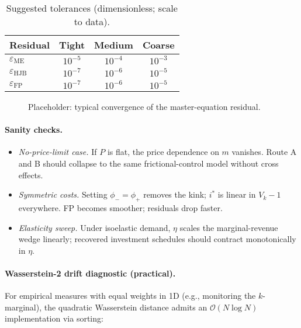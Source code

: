 ﻿\documentclass[11pt,letterpaper,oneside]{article}
\numberwithin{equation}{section}
\newcommand{\1}{\mathbf{1}}
\begin{document}
\begin{table}[ht]
\centering
\small
\begin{tabular}{@{}lccc@{}}
\toprule
Residual & Tight & Medium & Coarse \\
\midrule
$\varepsilon_{\mathrm{ME}}$ & $10^{-5}$ & $10^{-4}$ & $10^{-3}$ \\
$\varepsilon_{\mathrm{HJB}}$ & $10^{-7}$ & $10^{-6}$ & $10^{-5}$ \\
$\varepsilon_{\mathrm{FP}}$  & $10^{-7}$ & $10^{-6}$ & $10^{-5}$ \\
\bottomrule
\end{tabular}
\caption{Suggested tolerances (dimensionless; scale to data).}
\end{table}

\begin{figure}[ht]
\centering
{}
\caption{Placeholder: typical convergence of the master-equation residual.}
\end{figure}

\paragraph{Sanity checks.}
\begin{itemize}[leftmargin=1.25em]
\item \emph{No-price-limit case.} If $P$ is flat, the price dependence on $m$ vanishes. Route A and B should collapse to the same frictional-control model without cross effects.
\item \emph{Symmetric costs.} Setting $\phi_-=\phi_+$ removes the kink; $i^*$ is linear in $V_k-1$ everywhere. FP becomes smoother; residuals drop faster.
\item \emph{Elasticity sweep.} Under isoelastic demand, $\eta$ scales the marginal-revenue wedge linearly; recovered investment schedules should contract monotonically in $\eta$.
\end{itemize}

\paragraph{Wasserstein-2 drift diagnostic (practical).}
For empirical measures with equal weights in 1D (e.g., monitoring the $k$-marginal), the quadratic Wasserstein distance admits an $\mathcal O(N\log N)$ implementation via sorting:
\end{document}
